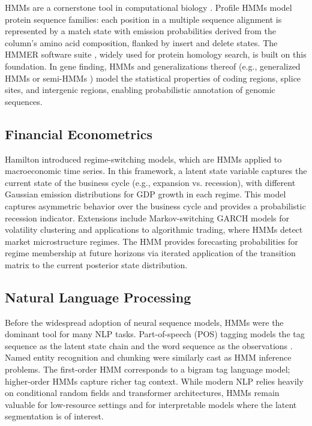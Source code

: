 \documentclass[conference]{IEEEtran}
\begin{document}
HMMs are a cornerstone tool in computational biology \cite{krogh1994hidden, durbin1998biological}. Profile HMMs model protein sequence families: each position in a multiple sequence alignment is represented by a match state with emission probabilities derived from the column's amino acid composition, flanked by insert and delete states. The HMMER software suite \cite{eddy1998profile}, widely used for protein homology search, is built on this foundation. In gene finding, HMMs and generalizations thereof (e.g., generalized HMMs or semi-HMMs \cite{durbin1998biological}) model the statistical properties of coding regions, splice sites, and intergenic regions, enabling probabilistic annotation of genomic sequences.

\subsection{Financial Econometrics}

Hamilton \cite{hamilton1989new} introduced regime-switching models, which are HMMs applied to macroeconomic time series. In this framework, a latent state variable captures the current state of the business cycle (e.g., expansion vs. recession), with different Gaussian emission distributions for GDP growth in each regime. This model captures asymmetric behavior over the business cycle and provides a probabilistic recession indicator. Extensions include Markov-switching GARCH models for volatility clustering \cite{hamilton2005regime} and applications to algorithmic trading, where HMMs detect market microstructure regimes. The HMM provides forecasting probabilities for regime membership at future horizons via iterated application of the transition matrix to the current posterior state distribution.

\subsection{Natural Language Processing}

Before the widespread adoption of neural sequence models, HMMs were the dominant tool for many NLP tasks. Part-of-speech (POS) tagging models the tag sequence as the latent state chain and the word sequence as the observations \cite{kupiec1992robust}. Named entity recognition and chunking were similarly cast as HMM inference problems. The first-order HMM corresponds to a bigram tag language model; higher-order HMMs capture richer tag context. While modern NLP relies heavily on conditional random fields \cite{lafferty2001conditional} and transformer architectures, HMMs remain valuable for low-resource settings and for interpretable models where the latent segmentation is of interest.
\end{document}
